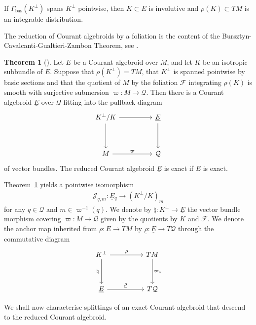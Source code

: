 \documentclass[a4paper, reqno, 11pt]{amsart}
\numberwithin{equation}{section}
\theoremstyle{definition}
\newtheorem{theorem}[equation]{Theorem}
\newcommand{\cf}[1]{\mathcal{#1}}
\newcommand{\red}[1]{\underline{#1}}
\newcommand{\cQ}{{\mathcal Q}}
\newcommand{\cF}{{\mathcal F}}
\theoremstyle{remark}
\begin{document}
If $\mathsf{\Gamma}_{\text{bas}}(K^\perp)$ spans $K^\perp$ pointwise, then $K\subset E$ is involutive and $\rho(K)\subset TM$ is an integrable distribution.

The reduction of Courant algebroids by a foliation is the content of the Bursztyn-Cavalcanti-Gualtieri-Zambon Theorem, see \cite{Bursztyn2007reduction, Zambon2008reduction}.

\begin{theorem}[\!\!\!\textbf{\cite[Theorem~3.7]{Zambon2008reduction}}]
\label{thm:reduction}
    Let $E$ be a Courant algebroid over $M$, and let $K$ be an isotropic subbundle of $E$.
    Suppose that $\rho(K^\perp) = TM$, that $K^\perp$ is  spanned pointwise by basic sections and that the quotient of $M$ by the foliation $\cf F$ integrating  $\rho(K)$ is smooth with surjective submersion $\varpi \colon M \to \cf Q$. Then there is a Courant algebroid $\red E$ over $\cf Q$ fitting into the pullback diagram
    \[
\begin{tikzcd}
K^\perp / K \arrow{rr}{} \arrow[swap]{dd}{} & & \red E \arrow[]{dd}{} \\ & & \\
M \arrow[]{rr}{\varpi} & & \cf Q 
\end{tikzcd}
\]
of vector bundles. The reduced Courant algebroid $\red E$ is exact if $E$ is exact. 
\end{theorem}

Theorem~\ref{thm:reduction} yields a pointwise isomorphism
\begin{align}\label{eqn:bethisom}
    \mathscr{J}_{q, m} \colon \red E{}_q \longrightarrow (K^\perp/K)_m
\end{align}
for any $q\in\cQ$ and $m \in \varpi^{-1}(q)$.
We denote by $\natural \colon K^\perp\to \red E$ the vector bundle morphism covering $\varpi \colon M\to\cQ$ given by the quotients by $K$ and $\cF$.
We denote the anchor map inherited from $\rho \colon E\to TM$ by $\red\rho \colon \red E\to T\cQ$ through the commutative diagram
 \[
\begin{tikzcd}
K^\perp \arrow{rr}{\rho} \arrow[swap]{dd}{\natural\,} & &  TM \arrow[]{dd}{\varpi_*} \\ & & \\
\red E \arrow[]{rr}{\red\rho} & & T\cf Q 
\end{tikzcd}
\]

We shall now characterise splittings of an exact Courant algebroid that descend to the reduced Courant algebroid.
\end{document}
